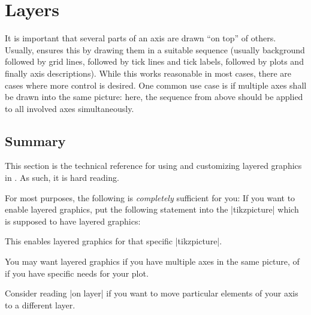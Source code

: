 
\section[reference.layers]{Layers}

{

It is important that several parts of an axis are drawn ``on top'' of others.
Usually, \PGFPlots{} ensures this by drawing them in a suitable sequence
(usually background followed by grid lines, followed by tick lines and tick
labels, followed by plots and finally axis descriptions). While this works
reasonable in most cases, there are cases where more control is desired. One
common use case is if multiple axes shall be drawn into the same picture: here,
the sequence from above should be applied to all involved axes simultaneously.


\subsection{Summary}

This section is the technical reference for using and customizing layered
graphics in \PGFPlots{}. As such, it is hard reading.

For most purposes, the following is \emph{completely} sufficient for you: If
you want to enable layered graphics, put the following statement into the
|tikzpicture| which is supposed to have layered graphics:

\begin{codeexample}
\end{codeexample}
\noindent This enables layered graphics for that specific |tikzpicture|.

You may want layered graphics if you have multiple axes in the same picture, of
if you have specific needs for your plot.

Consider reading |on layer| if you want to move particular elements of your
axis to a different layer.


}
